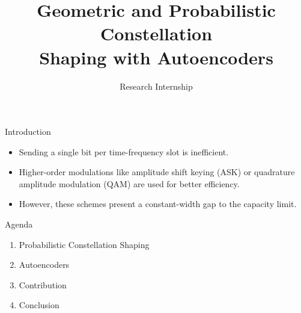 \documentclass[english,aspectratio=1610,9pt,helvet,nicetitles]{ICEbeamerTUMCD}
\title{Geometric and Probabilistic Constellation\\ \vspace{0.5cm} Shaping with Autoencoders}
\subtitle{Research Internship} %
\author{\PersonVorname{} \PersonNachname{}}
\institute[]{Technical University of Munich \\ Institute for Communications Engineering}
\begin{document}
\setlength{\baselineskip}{\PraesentationAbstandAbsatz}
\setlength{\parskip}{\baselineskip}
\PraesentationMasterStandard

\PraesentationTitelseite %


\begin{frame}{Introduction}
	\begin{figure}[h]
    \centering
	\end{figure}
	\begin{itemize}
	\item Sending a single bit per time-frequency slot is inefficient.
	\item Higher-order modulations like amplitude shift keying (ASK) or quadrature amplitude modulation (QAM) are used for better efficiency.
	\item However, these schemes present a constant-width gap to the capacity limit.
	\end{itemize}
\end{frame}

\begin{frame}{Agenda}
  \begin{enumerate}
  \item Probabilistic Constellation Shaping
  \item Autoencoders
  \item Contribution
  \item Conclusion
  \end{enumerate}
\end{frame}
\end{document}
